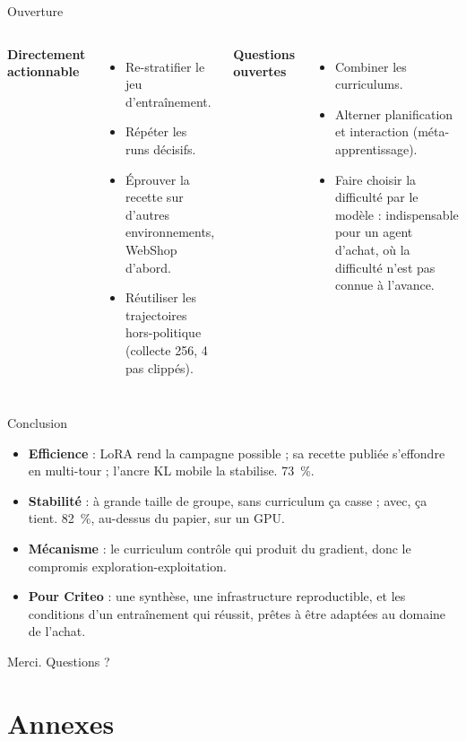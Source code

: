 \documentclass[aspectratio=169,11pt]{beamer}
\begin{document}
\begin{frame}{Ouverture}
\begin{columns}[T]
\textbf{Directement actionnable}
\begin{itemize}
    \item Re-stratifier le jeu d'entraînement.
    \item Répéter les runs décisifs.
    \item Éprouver la recette sur d'autres environnements, WebShop d'abord.
    \item Réutiliser les trajectoires hors-politique (collecte 256, 4 pas clippés).
\end{itemize}
\textbf{Questions ouvertes}
\begin{itemize}
    \item Combiner les curriculums.
    \item Alterner planification et interaction (méta-apprentissage).
    \item Faire choisir la difficulté par le modèle : indispensable pour un agent d'achat, où la difficulté n'est pas connue à l'avance.
\end{itemize}
\end{columns}
\end{frame}

\begin{frame}{Conclusion}
\begin{itemize}
    \item \textbf{Efficience} : LoRA rend la campagne possible ; sa recette publiée s'effondre en multi-tour ; l'ancre KL mobile la stabilise. 73~\%.
    \item \textbf{Stabilité} : à grande taille de groupe, sans curriculum ça casse ; avec, ça tient. 82~\%, au-dessus du papier, sur un GPU.
    \item \textbf{Mécanisme} : le curriculum contrôle qui produit du gradient, donc le compromis exploration-exploitation.
    \item \textbf{Pour Criteo} : une synthèse, une infrastructure reproductible, et les conditions d'un entraînement qui réussit, prêtes à être adaptées au domaine de l'achat.
\end{itemize}
\vspace{6pt}
\centering \large Merci. Questions ?
\end{frame}

\appendix
\section{Annexes}
\end{document}
